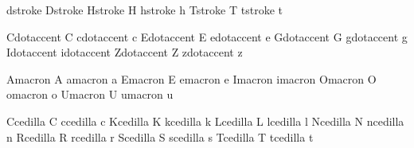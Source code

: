 
 dstroke          {\pseudoencodeddj}
 Dstroke          {\pseudoencodedDJ}
 Hstroke          {H}
 hstroke          {h}
 Tstroke          {T}
 tstroke          {t}

 Cdotaccent       {\buildtextaccent\textdotaccent C}
 cdotaccent       {\buildtextaccent\textdotaccent c}
 Edotaccent       {\buildtextaccent\textdotaccent E}
 edotaccent       {\buildtextaccent\textdotaccent e}
 Gdotaccent       {\buildtextaccent\textdotaccent G}
 gdotaccent       {\buildtextaccent\textdotaccent g}
 Idotaccent       {\buildtextaccent\textdotaccent \dotlessI}
 idotaccent       {\buildtextaccent\textdotaccent \dotlessi}
 Zdotaccent       {\buildtextaccent\textdotaccent Z}
 zdotaccent       {\buildtextaccent\textdotaccent z}

 Amacron          {\buildtextaccent\textmacron A}
 amacron          {\buildtextaccent\textmacron a}
 Emacron          {\buildtextaccent\textmacron E}
 emacron          {\buildtextaccent\textmacron e}
 Imacron          {\buildtextaccent\textmacron \dotlessI}
 imacron          {\buildtextaccent\textmacron \dotlessi}
 Omacron          {\buildtextaccent\textmacron O}
 omacron          {\buildtextaccent\textmacron o}
 Umacron          {\buildtextaccent\textmacron U}
 umacron          {\buildtextaccent\textmacron u}

 Ccedilla         {\buildtextcedilla C}
 ccedilla         {\buildtextcedilla c}
 Kcedilla         {\buildtextcedilla K}
 kcedilla         {\buildtextcedilla k}
 Lcedilla         {\buildtextcedilla L}
 lcedilla         {\buildtextcedilla l}
 Ncedilla         {\buildtextcedilla N}
 ncedilla         {\buildtextcedilla n}
 Rcedilla         {\buildtextcedilla R}
 rcedilla         {\buildtextcedilla r}
 Scedilla         {\buildtextcedilla S}
 scedilla         {\buildtextcedilla s}
 Tcedilla         {\buildtextcedilla T}
 tcedilla         {\buildtextcedilla t}

